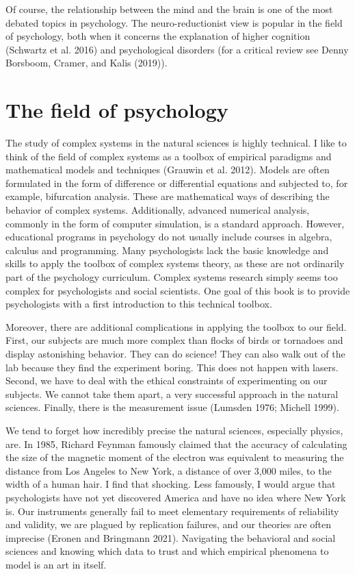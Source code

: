 \documentclass[
  a4paper,
  DIV=11,
  numbers=noendperiod,
  oneside]{scrreprt}
\begin{document}
Of course, the relationship between the mind and the brain is one of the
most debated topics in psychology. The neuro-reductionist view is
popular in the field of psychology, both when it concerns the
explanation of higher cognition (Schwartz et al. 2016) and psychological
disorders (for a critical review see Denny Borsboom, Cramer, and Kalis
(2019)).

\hypertarget{sec-The-field-of-psychology}{%
\section{The field of psychology}\label{sec-The-field-of-psychology}}

The study of complex systems in the natural sciences is highly
technical. I like to think of the field of complex systems as a toolbox
of empirical paradigms and mathematical models and techniques (Grauwin
et al. 2012). Models are often formulated in the form of difference or
differential equations and subjected to, for example, bifurcation
analysis. These are mathematical ways of describing the behavior of
complex systems. Additionally, advanced numerical analysis, commonly in
the form of computer simulation, is a standard approach. However,
educational programs in psychology do not usually include courses in
algebra, calculus and programming. Many psychologists lack the basic
knowledge and skills to apply the toolbox of complex systems theory, as
these are not ordinarily part of the psychology curriculum. Complex
systems research simply seems too complex for psychologists and social
scientists. One goal of this book is to provide psychologists with a
first introduction to this technical toolbox.

Moreover, there are additional complications in applying the toolbox to
our field. First, our subjects are much more complex than flocks of
birds or tornadoes and display astonishing behavior. They can do
science! They can also walk out of the lab because they find the
experiment boring. This does not happen with lasers. Second, we have to
deal with the ethical constraints of experimenting on our subjects. We
cannot take them apart, a very successful approach in the natural
sciences. Finally, there is the measurement issue (Lumsden 1976; Michell
1999).

We tend to forget how incredibly precise the natural sciences,
especially physics, are. In 1985, Richard Feynman famously claimed that
the accuracy of calculating the size of the magnetic moment of the
electron was equivalent to measuring the distance from Los Angeles to
New York, a distance of over 3,000 miles, to the width of a human hair.
I find that shocking. Less famously, I would argue that psychologists
have not yet discovered America and have no idea where New York is. Our
instruments generally fail to meet elementary requirements of
reliability and validity, we are plagued by replication failures, and
our theories are often imprecise (Eronen and Bringmann 2021). Navigating
the behavioral and social sciences and knowing which data to trust and
which empirical phenomena to model is an art in itself.
\end{document}
